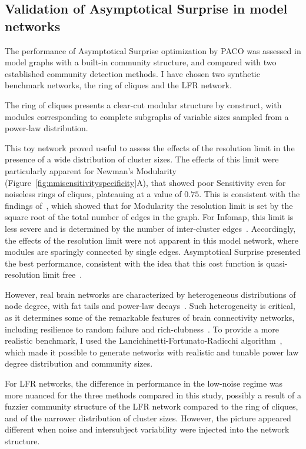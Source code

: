 \subsection{Validation of Asymptotical Surprise in model networks}
The performance of Asymptotical Surprise optimization by PACO was assessed in model graphs with a built-in community structure, and compared with two established community detection methods.
I have chosen two synthetic benchmark networks, the ring of cliques and the LFR network.

The ring of cliques presents a clear-cut modular structure by construct, with modules corresponding to complete subgraphs of variable sizes sampled from a power-law distribution.

This toy network proved useful to assess the effects of the resolution limit in the presence of a wide distribution of cluster sizes.
The effects of this limit were particularly apparent for Newman's Modularity (Figure~\ref{fig:nmisensitivityspecificity}A), that showed poor Sensitivity even for noiseless rings of cliques, plateauing at a value of $0.75$.
This is consistent with the findings of~\cite{fortunato2007}, which showed that for Modularity the resolution limit is set by the square root of the total number of edges in the graph.
For Infomap, this limit is less severe and is determined by the number of inter-cluster edges~\cite{kawamoto2015}.
Accordingly, the effects of the resolution limit were not apparent in this model network, where modules are sparingly connected by single edges.
Asymptotical Surprise presented the best performance, consistent with the idea that this cost function is quasi-resolution limit free~\cite{traag2015}.

However, real brain networks are characterized by heterogeneous distributions of node degree, with fat tails and power-law decays~\cite{bullmore2009}.
Such heterogeneity is critical, as it determines some of the remarkable features of brain connectivity networks, including resilience to random failure and rich-clubness~\cite{vandenheuvel2011,vandenheuvel2013a}.
To provide a more realistic benchmark, I used the Lancichinetti-Fortunato-Radicchi algorithm~\cite{lancichinetti2008}, which made it possible to generate networks with realistic and tunable power law degree distribution and community sizes.

For LFR networks, the difference in performance in the low-noise regime was more nuanced for the three methods compared in this study, possibly a result of a fuzzier community structure of the LFR network compared to the ring of cliques, and of the narrower distribution of cluster sizes.
However, the picture appeared different when noise and intersubject variability were injected into the network structure.


